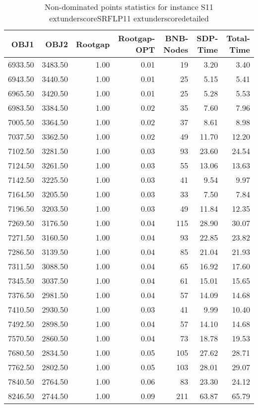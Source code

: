 \begin{table}
\caption{Non-dominated points statistics for instance S11	extunderscoreSRFLP11	extunderscoredetailed}
\label{tab:stats/S11_SRFLP11_detailed}
\begin{tabular}{rrrrrrr}
\toprule
OBJ1 & OBJ2 & Rootgap & Rootgap-OPT & BNB-Nodes & SDP-Time & Total-Time \\
\midrule
6933.50 & 3483.50 & 1.00 & 0.01 & 19 & 3.20 & 3.40 \\
6943.50 & 3440.50 & 1.00 & 0.01 & 25 & 5.15 & 5.41 \\
6965.50 & 3420.50 & 1.00 & 0.01 & 25 & 5.28 & 5.53 \\
6983.50 & 3384.50 & 1.00 & 0.02 & 35 & 7.60 & 7.96 \\
7005.50 & 3364.50 & 1.00 & 0.02 & 37 & 8.61 & 8.98 \\
7037.50 & 3362.50 & 1.00 & 0.02 & 49 & 11.70 & 12.20 \\
7102.50 & 3281.50 & 1.00 & 0.03 & 93 & 23.60 & 24.54 \\
7124.50 & 3261.50 & 1.00 & 0.03 & 55 & 13.06 & 13.63 \\
7142.50 & 3225.50 & 1.00 & 0.03 & 41 & 9.54 & 9.97 \\
7164.50 & 3205.50 & 1.00 & 0.03 & 33 & 7.50 & 7.84 \\
7196.50 & 3203.50 & 1.00 & 0.03 & 49 & 11.84 & 12.35 \\
7269.50 & 3176.50 & 1.00 & 0.04 & 115 & 28.90 & 30.07 \\
7271.50 & 3160.50 & 1.00 & 0.04 & 93 & 22.85 & 23.82 \\
7286.50 & 3139.50 & 1.00 & 0.04 & 85 & 21.04 & 21.93 \\
7311.50 & 3088.50 & 1.00 & 0.04 & 65 & 16.92 & 17.60 \\
7345.50 & 3037.50 & 1.00 & 0.04 & 61 & 15.01 & 15.65 \\
7376.50 & 2981.50 & 1.00 & 0.04 & 57 & 14.09 & 14.68 \\
7410.50 & 2930.50 & 1.00 & 0.03 & 41 & 9.99 & 10.40 \\
7492.50 & 2898.50 & 1.00 & 0.04 & 57 & 14.10 & 14.68 \\
7570.50 & 2860.50 & 1.00 & 0.04 & 73 & 18.78 & 19.53 \\
7680.50 & 2834.50 & 1.00 & 0.05 & 105 & 27.62 & 28.71 \\
7762.50 & 2802.50 & 1.00 & 0.05 & 103 & 28.01 & 29.07 \\
7840.50 & 2764.50 & 1.00 & 0.06 & 83 & 23.30 & 24.12 \\
8246.50 & 2744.50 & 1.00 & 0.09 & 211 & 63.87 & 65.79 \\

\end{tabular}
\end{table}
